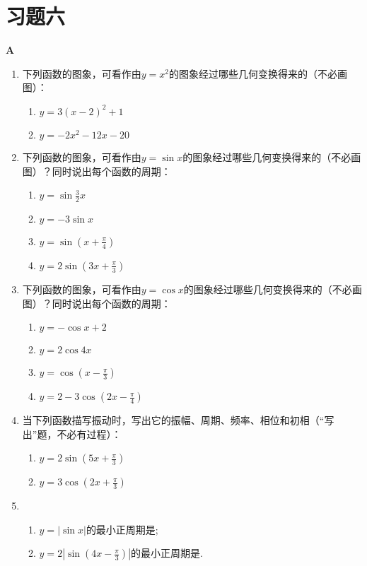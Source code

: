 \section*{习题六}
\begin{center}
    \bfseries A
\end{center}

\begin{enumerate}
    \item 下列函数的图象，可看作由$y=x^2$的图象经过哪些几何变换得来的（不必画图）：
\begin{multicols}{2}
\begin{enumerate}[(1)]
    \item $y=3(x-2)^2+1$
    \item $y=-2x^2-12x-20$
\end{enumerate}    
\end{multicols}

    
    \item  下列函数的图象，可看作由$y=\sin x$的图象经过哪些几何变换得来的（不必画图）？同时说出每个函数的周期：
\begin{multicols}{2}
\begin{enumerate}[(1)]
    \item $y=\sin \frac{3}{2}x$
    \item $y=-3\sin x$
    \item $y=\sin\left(x+\frac{\pi}{4}\right)$
    \item $y=2\sin\left(3x+\frac{\pi}{3}\right)$
\end{enumerate}    
\end{multicols}

    \item 下列函数的图象，可看作由$y=\cos x$的图象经过哪些几何变换得来的（不必画图）？同时说出每个函数的周期：
\begin{multicols}{2}
\begin{enumerate}[(1)]
\item $y=-\cos x +2$
\item $y=2\cos4x$
\item $y=\cos\left(x-\frac{\pi}{3}\right)$
\item $y=2-3\cos\left(2x-\frac{\pi}{4}\right)$
\end{enumerate}
\end{multicols}

\item 当下列函数描写振动时，写出它的振幅、周期、频率、相位和初相（“写出”题，不必有过程）：
\begin{multicols}{2}
\begin{enumerate}[(1)]
    \item $y=2\sin\left(5x+\frac{\pi}{3}\right)$
    \item $y=3\cos\left(2x+\frac{\pi}{3}\right)$
\end{enumerate}
\end{multicols}
\item \begin{enumerate}[(1)]
\item $y=|\sin x|$的最小正周期是\blank;
\item $y=2\left|\sin\left(4x-\frac{\pi}{3}\right)\right|$的最小正周期是\blank.
\end{enumerate}


\end{enumerate}
